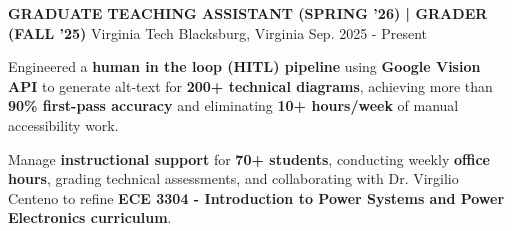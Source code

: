 

\begin{cventries}



  \cventry
    {\textbf{GRADUATE TEACHING ASSISTANT (SPRING '26) | GRADER (FALL '25)}} %
    {Virginia Tech} %
    {Blacksburg, Virginia} %
    {Sep. 2025 - Present} %
    {
      \begin{cvitems} %
       \item {Engineered a \textbf{human in the loop (HITL) pipeline} using \textbf{Google Vision API} to generate alt-text for \textbf{200+ technical diagrams}, achieving more than \textbf{90\% first-pass accuracy} and eliminating \textbf{10+ hours/week} of manual accessibility work.}
       \item {Manage \textbf{instructional support} for \textbf{70+ students}, conducting weekly \textbf{office hours}, grading technical assessments, and collaborating with Dr. Virgilio Centeno to refine \textbf{ECE 3304 - Introduction to Power Systems and Power Electronics curriculum}.}
      \end{cvitems}
    }



\end{cventries}
